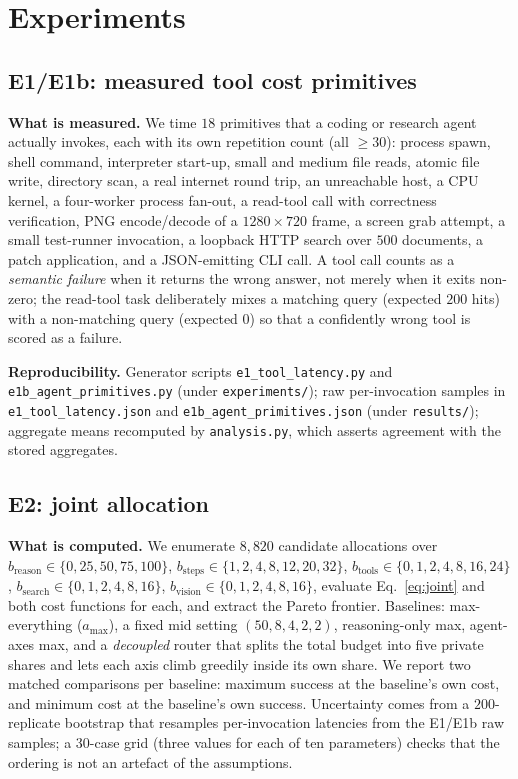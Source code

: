 \documentclass[10pt]{article} %
\newcommand{\eff}{b}
\newcommand{\reff}{\eff_{\mathrm{reason}}}
\newcommand{\stepeff}{\eff_{\mathrm{steps}}}
\newcommand{\tooleff}{\eff_{\mathrm{tools}}}
\newcommand{\searcheff}{\eff_{\mathrm{search}}}
\newcommand{\viseff}{\eff_{\mathrm{vision}}}
\begin{document}
\section{Experiments}
\label{sec:experiments}

\subsection{E1/E1b: measured tool cost primitives}
\label{sec:e1}

\textbf{What is measured.} We time $18$ primitives that a coding or research
agent actually invokes, each with its own repetition count (all $\geq 30$):
process spawn, shell command, interpreter start-up, small and medium file reads,
atomic file write, directory scan, a real internet round trip, an unreachable
host, a CPU kernel, a four-worker process fan-out, a read-tool call with
correctness verification, PNG encode/decode of a $1280\times720$ frame, a screen
grab attempt, a small test-runner invocation, a loopback HTTP search over $500$
documents, a patch application, and a JSON-emitting CLI call. A tool call counts
as a \emph{semantic failure} when it returns the wrong answer, not merely when it
exits non-zero; the read-tool task deliberately mixes a matching query (expected
$200$ hits) with a non-matching query (expected $0$) so that a confidently wrong
tool is scored as a failure.

\textbf{Reproducibility.} Generator scripts
\texttt{e1\_tool\_latency.py} and \texttt{e1b\_agent\_primitives.py} (under
\texttt{experiments/}); raw per-invocation samples in
\texttt{e1\_tool\_latency.json} and \texttt{e1b\_agent\_primitives.json} (under
\texttt{results/}); aggregate means recomputed by \texttt{analysis.py}, which
asserts agreement with the stored aggregates.

\subsection{E2: joint allocation}
\label{sec:e2}

\textbf{What is computed.} We enumerate $8{,}820$ candidate allocations over
$\reff\in\{0,25,50,75,100\}$, $\stepeff\in\{1,2,4,8,12,20,32\}$,
$\tooleff\in\{0,1,2,4,8,16,24\}$, $\searcheff\in\{0,1,2,4,8,16\}$,
$\viseff\in\{0,1,2,4,8,16\}$, evaluate Eq.~\eqref{eq:joint} and both cost functions
for each, and extract the Pareto frontier. Baselines: max-everything
($a_{\max}$), a fixed mid setting $(50,8,4,2,2)$, reasoning-only max, agent-axes
max, and a \emph{decoupled} router that splits the total budget into five private
shares and lets each axis climb greedily inside its own share. We report two
matched comparisons per baseline: maximum success at the baseline's own cost, and
minimum cost at the baseline's own success. Uncertainty comes from a
$200$-replicate bootstrap that resamples per-invocation latencies from the E1/E1b
raw samples; a $30$-case grid (three values for each of ten parameters) checks
that the ordering is not an artefact of the assumptions.
\end{document}
